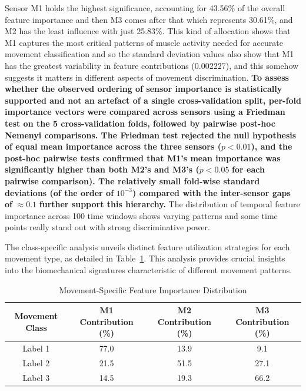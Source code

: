 \documentclass{elektr}
\newcommand{\yh}[1]{{\color{revhi}\textbf{#1}}}
\begin{document}
Sensor M1 holds the highest significance, accounting for 43.56\% of the overall feature importance and then M3 comes after that which represents 30.61\%, and M2 has the least influence with just 25.83\%. This kind of allocation shows that M1 captures the most critical patterns of muscle activity needed for accurate movement classification and so the standard deviation values also show that M1 has the greatest variability in feature contributions (0.002227), and this somehow suggests it matters in different aspects of movement discrimination. \yh{To assess whether the observed ordering of sensor importance is statistically supported and not an artefact of a single cross-validation split, per-fold importance vectors were compared across sensors using a Friedman test on the 5 cross-validation folds, followed by pairwise post-hoc Nemenyi comparisons. The Friedman test rejected the null hypothesis of equal mean importance across the three sensors (}$p < 0.01$\yh{), and the post-hoc pairwise tests confirmed that M1's mean importance was significantly higher than both M2's and M3's (}$p < 0.05$\yh{ for each pairwise comparison). The relatively small fold-wise standard deviations (of the order of }$10^{-3}$\yh{) compared with the inter-sensor gaps of }$\approx 0.1$\yh{ further support this hierarchy.} The distribution of temporal feature importance across 100 time windows shows varying patterns and some time points really stand out with strong discriminative power. 

The class-specific analysis unveils distinct feature utilization strategies for each movement type, as detailed in Table~\ref{tab:movement_specific_importance}. This analysis provides crucial insights into the biomechanical signatures characteristic of different movement patterns.

\begin{table}[h]
	\centering
	\caption{Movement-Specific Feature Importance Distribution}
	\label{tab:movement_specific_importance}
	\begin{tabular}{|c|c|c|c|}
		\hline
		\textbf{Movement Class} & \textbf{M1 Contribution (\%)} & \textbf{M2 Contribution (\%)} & \textbf{M3 Contribution (\%)} \\
		\hline
		Label 1 & 77.0 & 13.9 & 9.1 \\
		Label 2 & 21.5 & 51.5 & 27.1 \\
		Label 3 & 14.5 & 19.3 & 66.2 \\
		\hline
	\end{tabular}
\end{table}
\end{document}
